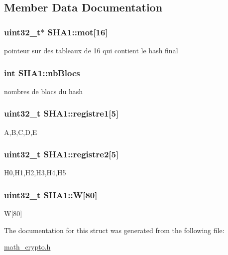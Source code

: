 \subsection{Member Data Documentation}
\hypertarget{structSHA1_acf9883e8bc9fcdf15922a5272ccba15f}{
\subsubsection[{mot}]{\setlength{\rightskip}{0pt plus 5cm}uint32\-\_\-t$\ast$ S\-H\-A1\-::mot\mbox{[}16\mbox{]}}}\label{structSHA1_acf9883e8bc9fcdf15922a5272ccba15f}
pointeur sur des tableaux de 16 qui contient le hash final \hypertarget{structSHA1_a7786a6dad7d75fbcba1208cf88d113df}{
\subsubsection[{nb\-Blocs}]{\setlength{\rightskip}{0pt plus 5cm}int S\-H\-A1\-::nb\-Blocs}}\label{structSHA1_a7786a6dad7d75fbcba1208cf88d113df}
nombres de blocs du hash \hypertarget{structSHA1_ac1d1253a9da2c2810eabb0fb2468fcbe}{
\subsubsection[{registre1}]{\setlength{\rightskip}{0pt plus 5cm}uint32\-\_\-t S\-H\-A1\-::registre1\mbox{[}5\mbox{]}}}\label{structSHA1_ac1d1253a9da2c2810eabb0fb2468fcbe}
A,B,C,D,E \hypertarget{structSHA1_af7e071a688c313290f010f7602143c4f}{
\subsubsection[{registre2}]{\setlength{\rightskip}{0pt plus 5cm}uint32\-\_\-t S\-H\-A1\-::registre2\mbox{[}5\mbox{]}}}\label{structSHA1_af7e071a688c313290f010f7602143c4f}
H0,H1,H2,H3,H4,H5 \hypertarget{structSHA1_adc45ee074d3aef3f5d891e5f294cffb0}{
\subsubsection[{W}]{\setlength{\rightskip}{0pt plus 5cm}uint32\-\_\-t S\-H\-A1\-::\-W\mbox{[}80\mbox{]}}}\label{structSHA1_adc45ee074d3aef3f5d891e5f294cffb0}
W\mbox{[}80\mbox{]} 

The documentation for this struct was generated from the following file\-:\begin{DoxyCompactItemize}
\item 
\hyperlink{math__crypto_8h}{math\-\_\-crypto.\-h}\end{DoxyCompactItemize}
